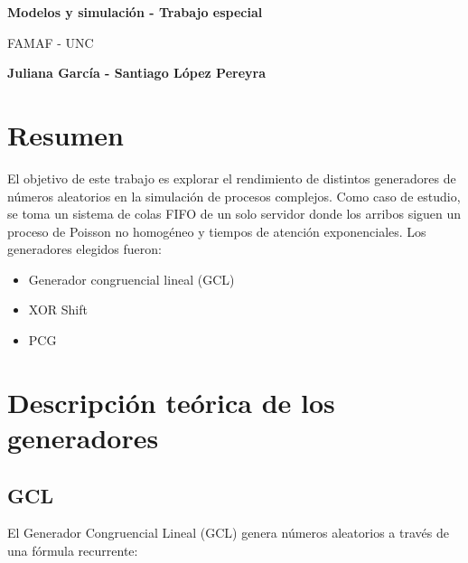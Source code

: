 \documentclass[a4paper, 12pt]{article}
\begin{document}
\begin{titlepage}
   \begin{center}
       \vspace*{1cm}

       \Huge
       \textbf{Modelos y simulación - Trabajo especial}

       \vspace{0.5cm}
        FAMAF - UNC
            
       \vspace{1.5cm}
       \large
       \textbf{Juliana García - Santiago López Pereyra}
       \normalsize

       \vfill
            
            
     
   \end{center}
\end{titlepage}

   
\maketitle
\pagebreak

\section{Resumen}

El objetivo de este trabajo es explorar el rendimiento de distintos generadores
de números aleatorios en la simulación de procesos complejos. Como caso de
estudio, se toma un sistema de colas FIFO de un solo servidor donde los arribos
siguen un proceso de Poisson no homogéneo y tiempos de atención exponenciales.
Los generadores elegidos fueron:

\begin{itemize}
    \item Generador congruencial lineal (GCL)
    \item XOR Shift 
    \item PCG
\end{itemize}

\section{Descripción teórica de los generadores}

\subsection{GCL}

El Generador Congruencial Lineal (GCL) genera números aleatorios a través de una
fórmula recurrente:
\end{document}
